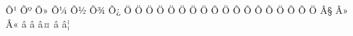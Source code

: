 ^^d5^^b9{\armcha}%
^^d5^^ba{\armpe}%
^^d5^^bb{\armje}%
^^d5^^bc{\armra}%
^^d5^^bd{\armse}%
^^d5^^be{\armvev}%
^^d5^^bf{\armtyun}%
^^d6^^80{\armre}%
^^d6^^81{\armtso}%
^^d6^^82{\armvyun}%
^^d6^^83{\armpyur}%
^^d6^^84{\armke}%
^^d6^^85{\armo}%
^^d6^^86{\armfe}%
%
%
%
%
^^d6^^89{\armfullstop}%
^^d5^^9d{\armsep}%
^^d6^^8a{\armyentamna}%
^^d5^^9c{\armexclam}%
^^d5^^9b{\armaccent}%
^^d5^^9e{\armquestion}%
^^d5^^9a{\armapostrophe}%
^^d6^^87{\armew}%
^^d5^^9f{\armabbrev}%
^^d5^^99{\armnum}%
^^d6^^8f{\armdram}%
^^c2^^a7{\armsection}%
^^c2^^bb{\armquotright}%
^^c2^^ab{\armquotleft}%
^^e2^^80^^95{\armemdash}%
^^e2^^80^^94{\armemdash}%
^^e2^^80^^a4{\armdot}%
^^e2^^80^^90{\armendash}%
^^e2^^80^^a6{\armellipsis}%
